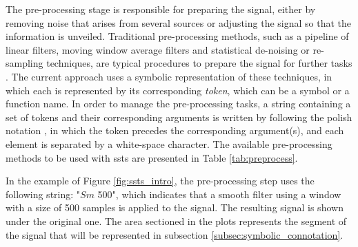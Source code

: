 The pre-processing stage is responsible for preparing the signal, either by removing noise that arises from several sources or adjusting the signal so that the information is unveiled. Traditional pre-processing methods, such as a pipeline of linear filters, moving window average filters and statistical de-noising or re-sampling techniques, are typical procedures to prepare the signal for further tasks \cite{preProcessing}. The current approach uses a symbolic representation of these techniques, in which each is represented by its corresponding \textit{token}, which can be a symbol or a function name. In order to manage the pre-processing tasks, a string containing a set of tokens and their corresponding arguments is written by following the polish notation \cite{polishNotation}, in which the token precedes the corresponding argument(s), and each element is separated by a white-space character. The available pre-processing methods to be used with \gls{ssts} are presented in Table \ref{tab:preprocess}.
\par
In the example of Figure \ref{fig:ssts_intro}, the pre-processing step uses the following string: "$Sm$ 500", which indicates that a smooth filter using a window with a size of 500 samples is applied to the signal. The resulting signal is shown under the original one. The area sectioned in the plots represents the segment of the signal that will be represented in subsection \ref{subsec:symbolic_connotation}.


